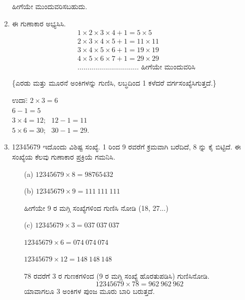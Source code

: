 \begin{enumerate}
ಹೀಗೆಯೇ ಮುಂದುವರಿಸಬಹುದು.

\item ಈ ಗುಣಾಕಾರ ಅಭ್ಯಸಿಸಿ.
\begin{align*}
& 1\times 2\times 3\times 4+1 = 5\times 5\\
& 2\times 3\times 4\times 5+1 = 11\times 11\\
& 3\times 4\times 5\times 6+1 = 19\times 19\\
& 4\times 5\times 6\times 7+1 = 29\times 29\\
& ...............................  \text{ ಹೀಗೆಯೇ ಮುಂದುವರಿಸಿ}
\end{align*}

\{ಎರಡು ಮತ್ತು ಮೂರನೆ ಅಂಕಿಗಳನ್ನು ಗುಣಿಸಿ, ಲಬ್ಧದಿಂದ 1 ಕಳೆದರೆ ವರ್ಗಸಂಖ್ಯೆ\break ಸಿಗುತ್ತದೆ.\}

\begin{tabbing}
ಉದಾ:\quad \= $2\times 3 =6$\\[3pt]
     \> $6-1=5$\\[3pt]
     \> $3\times 4=12$; \ $12-1=11$\\[3pt]
     \> $5\times 6=30$; \ $30-1=29$.
\end{tabbing}

\item 12345679 ಇದೊಂದು ವಿಶಿಷ್ಟ ಸಂಖ್ಯೆ. 1 ರಿಂದ 9 ರವರೆಗೆ ಕ್ರಮವಾಗಿ ಬರೆದಿದೆ, 8 ನ್ನು ಕೈ ಬಿಟ್ಟಿದೆ. ಈ ಸಂಖ್ಯೆಯ ಕೆಲವು ಗುಣಾಕಾರ ಪ್ರಕ್ರಿಯೆ ಗಮನಿಸಿ.

\smallskip
\begin{itemize}
\itemsep=5pt
\item[(a)] $12345679\times 8 = 98765432$

\item[(b)] $12345679\times 9 = 111 \ 111 \ 111$

ಹೀಗೆಯೇ 9 ರ ಮಗ್ಗಿ ಸಂಖ್ಯೆಗಳಿಂದ ಗುಣಿಸಿ ನೋಡಿ (18, 27...)

\item[(c)] $12345679\times 3 = 037 \ 037 \ 037$

$12345679 \times 6 = 074 \ 074 \ 074$

$12345679 \times 12 = 148 \ 148 \ 148$

\smallskip

78 ರವರೆಗೆ 3 ರ ಗುಣಕಗಳಿಂದ (9 ರ ಮಗ್ಗಿ ಸಂಖ್ಯೆ ಹೊರತುಪಡಿಸಿ) ಗುಣಿಸಿ\break ನೋಡಿ.
$$
12345679\times 78 = 962 \ 962 \ 962
$$ 
ಯಾವಾಗಲೂ 3 ಅಂಕಿಗಳ ಪುಂಜ ಮೂರು ಬಾರಿ ಬರುತ್ತದೆ.
\end{itemize}

\newpage


\end{enumerate}
